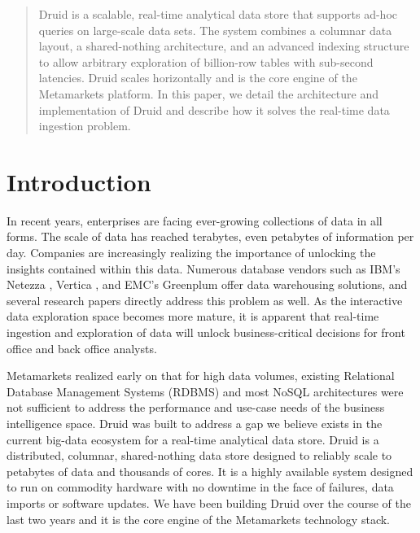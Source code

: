 \documentclass{vldb}
\begin{document}
\maketitle

\begin{abstract}
Druid is a scalable, real-time analytical data store that supports
ad-hoc queries on large-scale data sets. The system combines a
columnar data layout, a shared-nothing architecture, and an advanced
indexing structure to allow arbitrary exploration of billion-row
tables with sub-second latencies. Druid scales horizontally and is the
core engine of the Metamarkets platform. In this paper, we detail the
architecture and implementation of Druid and describe how it solves
the real-time data ingestion problem.
\end{abstract}

\section{Introduction}
In recent years, enterprises are facing ever-growing collections of
data in all forms. The scale of data has reached terabytes, even
petabytes of information per day. Companies are increasingly realizing
the importance of unlocking the insights contained within this
data. Numerous database vendors such as IBM’s Netezza \cite{singh2011introduction}, Vertica
\cite{bear2012vertica}, and EMC’s Greenplum \cite{miner2012unified} offer data warehousing solutions, and
several research papers \cite{barroso2009datacenter,
chaudhuri1997overview, dewitt1992parallel} directly address this problem as
well. As the interactive data exploration space becomes more mature,
it is apparent that real-time ingestion and exploration of data will
unlock business-critical decisions for front office and back office
analysts.

Metamarkets realized early on that for high data volumes, existing
Relational Database Management Systems (RDBMS) and most NoSQL
architectures were not sufficient to address the performance and
use-case needs of the business intelligence space. Druid was built to
address a gap we believe exists in the current big-data ecosystem for
a real-time analytical data store. Druid is a distributed, columnar,
shared-nothing data store designed to reliably scale to petabytes of
data and thousands of cores. It is a highly available system designed
to run on commodity hardware with no downtime in the face of failures,
data imports or software updates. We have been building Druid over the
course of the last two years and it is the core engine of the
Metamarkets technology stack.
\end{document}
